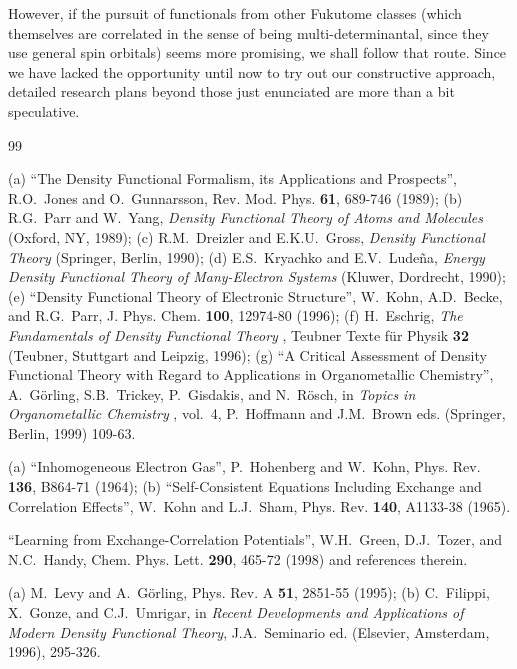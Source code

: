 \documentclass[nofootinbib,floatfix,aps,pra,preprint]{revtex4}
\begin{document}
\textrm{However, if the pursuit of functionals from other Fukutome classes
(which themselves are correlated in the sense of being multi-determinantal,
since they use general spin orbitals) seems more promising, we shall follow
that route. Since we have lacked the opportunity until now to try out our
constructive approach, detailed research plans beyond those just enunciated
are more than a bit speculative. }

\textrm{\vspace{1.1cm} }

\begin{thebibliography}{99}
\bibitem{} \textrm{%
}

 \textrm{{\small (a) ``The Density Functional Formalism,
its Applications and Prospects'', R.O.~Jones and O.~Gunnarsson, Rev. Mod.
Phys. \textbf{61}, 689-746 (1989); (b) R.G.~Parr and W.~Yang, \textit{%
Density Functional Theory of Atoms and Molecules} (Oxford, NY, 1989); (c)
R.M.~Dreizler and E.K.U.~Gross, \textit{Density Functional Theory}
(Springer, Berlin, 1990); (d) E.S.~Kryachko and E.V.~Lude\~na, \textit{%
Energy Density Functional Theory of Many-Electron Systems} (Kluwer,
Dordrecht, 1990); (e) ``Density Functional Theory of Electronic Structure'',
W.~Kohn, A.D.~Becke, and R.G.~Parr, J. Phys. Chem. \textbf{100}, 12974-80
(1996); (f) H.~Eschrig, \textit{The Fundamentals of Density Functional Theory%
}, Teubner Texte f\"ur Physik \textbf{32} (Teubner, Stuttgart and Leipzig,
1996); (g) ``A Critical Assessment of Density Functional Theory with Regard
to Applications in Organometallic Chemistry'', A.~G{\"o}rling, S.B.~Trickey,
P.~Gisdakis, and N.~R{\"o}sch, in \textit{Topics in Organometallic Chemistry}%
, vol.\ 4, P.~Hoffmann and J.M.~Brown eds. (Springer, Berlin, 1999) 109-63. }%
}

 \textrm{{\small (a) ``Inhomogeneous Electron Gas'',
P.~Hohenberg and W.~Kohn, Phys. Rev. \textbf{136}, B864-71 (1964); (b)
``Self-Consistent Equations Including Exchange and Correlation Effects'',
W.~Kohn and L.J.~Sham, Phys. Rev. \textbf{140}, A1133-38 (1965). }}

 \textrm{{\small ``Learning from Exchange-Correlation
Potentials'', W.H.~Green, D.J.~Tozer, and N.C.~Handy, Chem. Phys. Lett. 
\textbf{290}, 465-72 (1998) and references therein. }}

 \textrm{{\small (a) M.~Levy and A.~G\"orling, Phys. Rev. A 
\textbf{51}, 2851-55 (1995); (b) C.~Filippi, X.~Gonze, and C.J.~Umrigar, in 
\emph{Recent Developments and Applications of Modern Density Functional
Theory}, J.A.~Seminario ed. (Elsevier, Amsterdam, 1996), 295-326. }}


\end{thebibliography}
\end{document}
